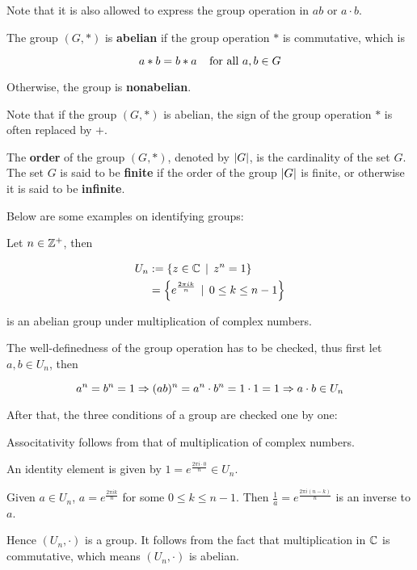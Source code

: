 \documentclass[a4paper,12pt]{article}
\begin{document}
Note that it is also allowed to express the group operation in $ab$ or $a\cdot b$.\n

\begin{dft}
  The group $(G,*)$ is \textbf{abelian} if the group operation $*$ is commutative, which is

  $$a*b=b*a\;\;\;\;\text{for all }a,b\in G$$\s

  Otherwise, the group is \textbf{nonabelian}.
\end{dft}\n

Note that if the group $(G,*)$ is abelian, the sign of the group operation $*$ is often replaced by $+$.\n

\begin{dft}
  The \textbf{order} of the group $(G,*)$, denoted by $\left| G\right|$, is the cardinality of the set $G$. The set $G$ is said to be \textbf{finite} if the order of the group $\left| G\right|$ is finite, or otherwise it is said to be \textbf{infinite}.
\end{dft}\n

Below are some examples on identifying groups:\n

\begin{exm}
  Let $n\in\mathbb{Z}^{+}$, then

  $$\begin{aligned}[t]
    U_{n}&:=\left\{ z\in\mathbb{C}\,\mid\, z^{n}=1\right\}\\
    &=\left\{ e^{\frac{2\pi ik}{n}}\,\mid\, 0\leq k\leq n-1\right\}
  \end{aligned}$$\s

  is an abelian group under multiplication of complex numbers.\n

  \prf[zb] The well-definedness of the group operation has to be checked, thus first let $a,b\in U_{n}$, then

  $$a^{n}=b^{n}=1\\
  \Rightarrow(ab)^{n}=a^{n}\cdot b^{n}=1\cdot 1=1\\
  \Rightarrow a\cdot b\in U_{n}$$\s

  After that, the three conditions of a group are checked one by one:

  \begin{alist}
    \item Associtativity follows from that of multiplication of complex numbers.
    \item An identity element is given by $1=e^{\frac{2\pi i\cdot 0}{n}}\in U_{n}$.
    \item Given $a\in U_{n}$, $a=e^{\frac{2\pi ik}{n}}$ for some $0\leq k\leq n-1$. Then $\frac{1}{a}=e^{\frac{2\pi i(n-k)}{n}}$ is an inverse to $a$.
  \end{alist}

  Hence $(U_{n},\cdot)$ is a group. It follows from the fact that multiplication in $\mathbb{C}$ is commutative, which means $(U_{n},\cdot)$ is abelian.
\end{exm}\n
\end{document}
